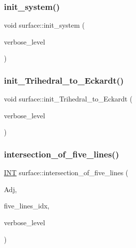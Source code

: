 \mbox{\label{classsurface_a7fbcf60eff1b8fcf85459e8ee821fe36}} 
\subsubsection{\texorpdfstring{init\+\_\+system()}{init\_system()}}
{\footnotesize\ttfamily void surface\+::init\+\_\+system (\begin{DoxyParamCaption}\item[{\mbox{\hyperlink{galois_8h_a09fddde158a3a20bd2dcadb609de11dc}{I\+NT}}}]{verbose\+\_\+level }\end{DoxyParamCaption})}

\mbox{\label{classsurface_a1148e4fd151382344a4a7cc76f8197d4}} 
\subsubsection{\texorpdfstring{init\+\_\+\+Trihedral\+\_\+to\+\_\+\+Eckardt()}{init\_Trihedral\_to\_Eckardt()}}
{\footnotesize\ttfamily void surface\+::init\+\_\+\+Trihedral\+\_\+to\+\_\+\+Eckardt (\begin{DoxyParamCaption}\item[{\mbox{\hyperlink{galois_8h_a09fddde158a3a20bd2dcadb609de11dc}{I\+NT}}}]{verbose\+\_\+level }\end{DoxyParamCaption})}

\mbox{\label{classsurface_a994c8b2a2d1030dd5dd4c485ca74deca}} 
\subsubsection{\texorpdfstring{intersection\+\_\+of\+\_\+five\+\_\+lines()}{intersection\_of\_five\_lines()}}
{\footnotesize\ttfamily \mbox{\hyperlink{galois_8h_a09fddde158a3a20bd2dcadb609de11dc}{I\+NT}} surface\+::intersection\+\_\+of\+\_\+five\+\_\+lines (\begin{DoxyParamCaption}\item[{\mbox{\hyperlink{galois_8h_a09fddde158a3a20bd2dcadb609de11dc}{I\+NT}} $\ast$}]{Adj,  }\item[{\mbox{\hyperlink{galois_8h_a09fddde158a3a20bd2dcadb609de11dc}{I\+NT}} $\ast$}]{five\+\_\+lines\+\_\+idx,  }\item[{\mbox{\hyperlink{galois_8h_a09fddde158a3a20bd2dcadb609de11dc}{I\+NT}}}]{verbose\+\_\+level }\end{DoxyParamCaption})}

